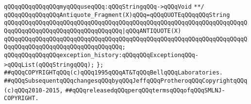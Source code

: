 \verb|qQQqqQQqqQQqqQQqmyqQQquseqQQq:qQQqStringqQQq->qQQqVoid|\newline
\verb|**/|\newline
\newline
\verb|qQQqqQQqqQQqqQQqAntiquote_Fragment(X)qQQq=qQQqQUOTEqQQqqQQqString|\newline
\verb|qQQqqQQqqQQqqQQqqQQqqQQqqQQqqQQqqQQqqQQqqQQqqQQqqQQqqQQqqQQqqQQqqQQqqQQqqQQqqQQqqQQqqQQqqQQqqQQqqQQqqQQq|\verb#|qQQqANTIQUOTE(X)#\newline
\verb|qQQqqQQqqQQqqQQqqQQqqQQqqQQqqQQqqQQqqQQqqQQqqQQqqQQqqQQqqQQqqQQqqQQqqQQqqQQqqQQqqQQqqQQqqQQqqQQqqQQqqQQq;|\newline
\newline
\verb|qQQqqQQqqQQqqQQqexception_history:qQQqqQQqExceptionqQQq->qQQqList(qQQqStringqQQq);|\newline
\verb|};|\newline
\newline
\newline
\newline
\newline
\verb|##qQQqCOPYRIGHTqQQq(c)qQQq1995qQQqAT&TqQQqBellqQQqLaboratories.|\newline
\verb|##qQQqSubsequentqQQqchangesqQQqbyqQQqJeffqQQqProtheroqQQqCopyrightqQQq(c)qQQq2010-2015,|\newline
\verb|##qQQqreleasedqQQqperqQQqtermsqQQqofqQQqSMLNJ-COPYRIGHT.|\newline

